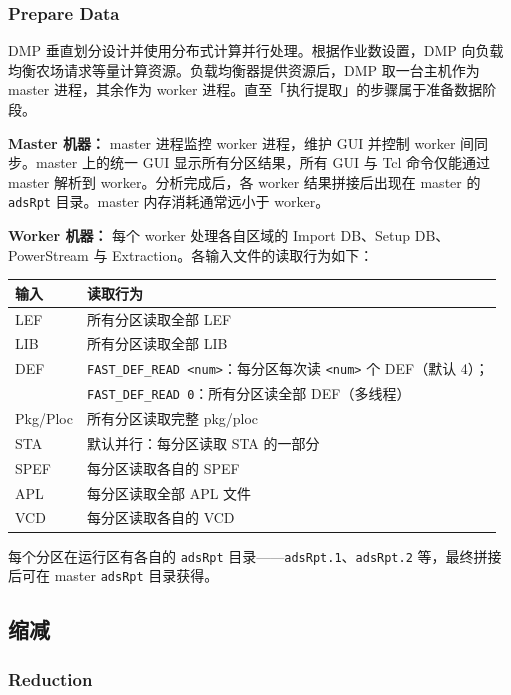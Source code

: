 \subsubsection*{Prepare Data}

DMP 垂直划分设计并使用分布式计算并行处理。根据作业数设置，DMP 向负载均衡农场请求等量计算资源。负载均衡器提供资源后，DMP 取一台主机作为 master 进程，其余作为 worker 进程。直至「执行提取」的步骤属于准备数据阶段。


\textbf{Master 机器：} master 进程监控 worker 进程，维护 GUI 并控制 worker 间同步。master 上的统一 GUI 显示所有分区结果，所有 GUI 与 Tcl 命令仅能通过 master 解析到 worker。分析完成后，各 worker 结果拼接后出现在 master 的 \texttt{adsRpt} 目录。master 内存消耗通常远小于 worker。

\textbf{Worker 机器：} 每个 worker 处理各自区域的 Import DB、Setup DB、PowerStream 与 Extraction。各输入文件的读取行为如下：

\begin{table}[htbp]
\centering
\small
\begin{tabular}{ll}
\toprule
\textbf{输入} & \textbf{读取行为} \\
\midrule
LEF & 所有分区读取全部 LEF \\
LIB & 所有分区读取全部 LIB \\
DEF & \texttt{FAST\_DEF\_READ <num>}：每分区每次读 \texttt{<num>} 个 DEF（默认 4）；\\
    & \texttt{FAST\_DEF\_READ 0}：所有分区读全部 DEF（多线程） \\
Pkg/Ploc & 所有分区读取完整 pkg/ploc \\
STA & 默认并行：每分区读取 STA 的一部分 \\
SPEF & 每分区读取各自的 SPEF \\
APL & 每分区读取全部 APL 文件 \\
VCD & 每分区读取各自的 VCD \\
\bottomrule
\end{tabular}
\end{table}

每个分区在运行区有各自的 \texttt{adsRpt} 目录——\texttt{adsRpt.1}、\texttt{adsRpt.2} 等，最终拼接后可在 master \texttt{adsRpt} 目录获得。

\subsection{缩减}
\subsubsection*{Reduction}

